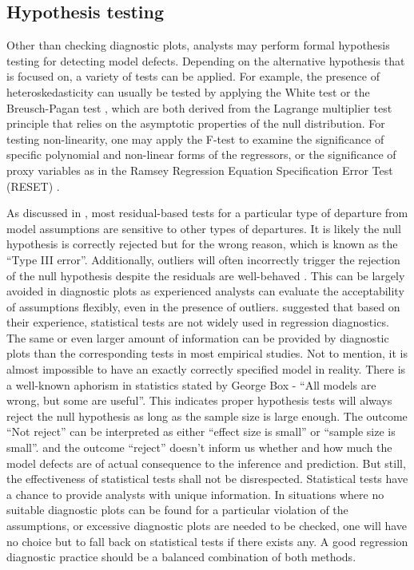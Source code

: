 \documentclass[]{interact}
\theoremstyle{plain}%
\theoremstyle{definition}
\theoremstyle{remark}
\begin{document}
\hypertarget{hypothesis-testing}{%
\subsection{Hypothesis testing}\label{hypothesis-testing}}

Other than checking diagnostic plots, analysts may perform formal
hypothesis testing for detecting model defects. Depending on the
alternative hypothesis that is focused on, a variety of tests can be
applied. For example, the presence of heteroskedasticity can usually be
tested by applying the White test
\citep{white_heteroskedasticity-consistent_1980} or the Breusch-Pagan
test \citep{breusch_simple_1979}, which are both derived from the
Lagrange multiplier test \citep{silvey1959lagrangian} principle that
relies on the asymptotic properties of the null distribution. For
testing non-linearity, one may apply the F-test to examine the
significance of specific polynomial and non-linear forms of the
regressors, or the significance of proxy variables as in the Ramsey
Regression Equation Specification Error Test (RESET)
\citep{ramsey_tests_1969}.

As discussed in \citet{cook1982residuals}, most residual-based tests for
a particular type of departure from model assumptions are sensitive to
other types of departures. It is likely the null hypothesis is correctly
rejected but for the wrong reason, which is known as the ``Type III
error''. Additionally, outliers will often incorrectly trigger the
rejection of the null hypothesis despite the residuals are well-behaved
\citep{cook_applied_1999}. This can be largely avoided in diagnostic
plots as experienced analysts can evaluate the acceptability of
assumptions flexibly, even in the presence of outliers.
\citet{montgomery1982introduction} suggested that based on their
experience, statistical tests are not widely used in regression
diagnostics. The same or even larger amount of information can be
provided by diagnostic plots than the corresponding tests in most
empirical studies. Not to mention, it is almost impossible to have an
exactly correctly specified model in reality. There is a well-known
aphorism in statistics stated by George Box - ``All models are wrong,
but some are useful''. This indicates proper hypothesis tests will
always reject the null hypothesis as long as the sample size is large
enough. The outcome ``Not reject'' can be interpreted as either ``effect
size is small'' or ``sample size is small''. and the outcome ``reject''
doesn't inform us whether and how much the model defects are of actual
consequence to the inference and prediction. But still, the
effectiveness of statistical tests shall not be disrespected.
Statistical tests have a chance to provide analysts with unique
information. In situations where no suitable diagnostic plots can be
found for a particular violation of the assumptions, or excessive
diagnostic plots are needed to be checked, one will have no choice but
to fall back on statistical tests if there exists any. A good regression
diagnostic practice should be a balanced combination of both methods.
\end{document}
